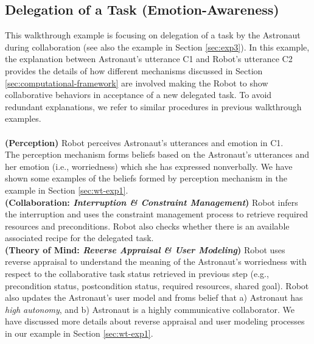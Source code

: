 \subsection{Delegation of a Task (Emotion-Awareness)}
\label{sec:wt-exp3}

This walkthrough example is focusing on delegation of a task by the Astronaut
during collaboration (see also the example in Section \ref{sec:exp3}). In this
example, the explanation between Astronaut's utterance C1 and Robot's utterance
C2 provides the details of how different mechanisms discussed in Section
\ref{sec:computational-framework} are involved making the Robot to show
collaborative behaviors in acceptance of a new delegated task. To avoid
redundant explanations, we refer to similar procedures in previous walkthrough
examples.\\

\noindent{}\\

\noindent\textbf{(Perception)} Robot perceives Astronaut's utterances and
emotion in C1.\\

The perception mechanism forms beliefs based on the Astronaut's utterances and
her emotion (i.e., worriedness) which she has expressed nonverbally. We have
shown some examples of the beliefs formed by perception mechanism in the example
in Section \ref{sec:wt-exp1}.\\

\noindent\textbf{(Collaboration: \textit{Interruption \& Constraint
Management})} Robot infers the interruption and uses the constraint management
process to retrieve required resources and preconditions. Robot also checks
whether there is an available associated recipe for the delegated task.\\

\noindent\textbf{(Theory of Mind: \textit{Reverse Appraisal \& User Modeling})}
Robot uses reverse appraisal to understand the meaning of the Astronaut's
worriedness with respect to the collaborative task status retrieved in previous
step (e.g., precondition status, postcondition status, required resources,
shared goal). Robot also updates the Astronaut's user model and froms belief
that a) Astronaut has \textit{high autonomy}, and b) Astronaut is a highly
communicative collaborator. We have discussed more details about reverse
appraisal and user modeling processes in our example in Section
\ref{sec:wt-exp1}.\\


